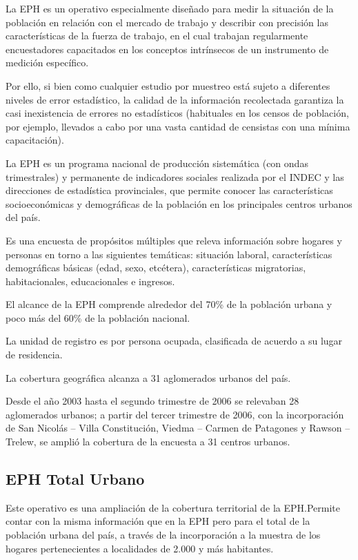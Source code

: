 \documentclass[
  openany]{book}
\begin{document}
La EPH es un operativo especialmente diseñado para medir la situación de la población en relación con el mercado de trabajo y describir con precisión las características de la fuerza de trabajo, en el cual trabajan regularmente encuestadores capacitados en los conceptos intrínsecos de un instrumento de medición específico.

Por ello, si bien como cualquier estudio por muestreo está sujeto a diferentes niveles de error estadístico, la calidad de la información recolectada garantiza la casi inexistencia de errores no estadísticos (habituales en los censos de población, por ejemplo, llevados a cabo por una vasta cantidad de censistas con una mínima capacitación).

La EPH es un programa nacional de producción sistemática (con ondas trimestrales) y permanente de indicadores sociales realizada por el INDEC y las direcciones de estadística provinciales, que permite conocer las características socioeconómicas y demográficas de la población en los principales centros urbanos del país.

Es una encuesta de propósitos múltiples que releva información sobre hogares y personas en torno a las siguientes temáticas: situación laboral, características demográficas básicas (edad, sexo, etcétera), características migratorias, habitacionales, educacionales e ingresos.

El alcance de la EPH comprende alrededor del 70\% de la población urbana y poco más del 60\% de la población nacional.

La unidad de registro es por persona ocupada, clasificada de acuerdo a su lugar de residencia.

La cobertura geográfica alcanza a 31 aglomerados urbanos del país.

Desde el año 2003 hasta el segundo trimestre de 2006 se relevaban 28 aglomerados urbanos; a partir del tercer trimestre de 2006, con la incorporación de San Nicolás -- Villa Constitución, Viedma -- Carmen de Patagones y Rawson -- Trelew, se amplió la cobertura de la encuesta a 31 centros urbanos.

\hypertarget{eph-total-urbano}{%
\subsection{EPH Total Urbano}\label{eph-total-urbano}}

Este operativo es una ampliación de la cobertura territorial de la EPH.Permite contar con la misma información que en la EPH pero para el total de la población urbana del país, a través de la incorporación a la muestra de los hogares pertenecientes a localidades de 2.000 y más habitantes.
\end{document}
